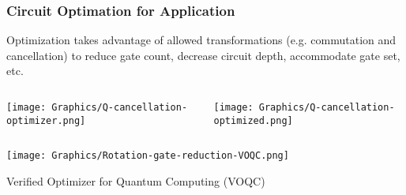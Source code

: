 
\begin{frame}
  \frametitle{Circuit Optimation for Application}
  Optimization takes advantage of allowed transformations (e.g. commutation
  and cancellation) to reduce gate count, decrease circuit depth,
  accommodate gate set, etc. 
  \begin{columns}
    \texttt{[image: Graphics/Q-cancellation-optimizer.png]}

    \texttt{[image: Graphics/Q-cancellation-optimized.png]}
  \end{columns}
  \begin{center}
    \vspace*{-\baselineskip}
    \texttt{[image: Graphics/Rotation-gate-reduction-VOQC.png]}
  \end{center}

  Verified Optimizer for Quantum Computing (VOQC)~\cite{VOQC}
\end{frame}
